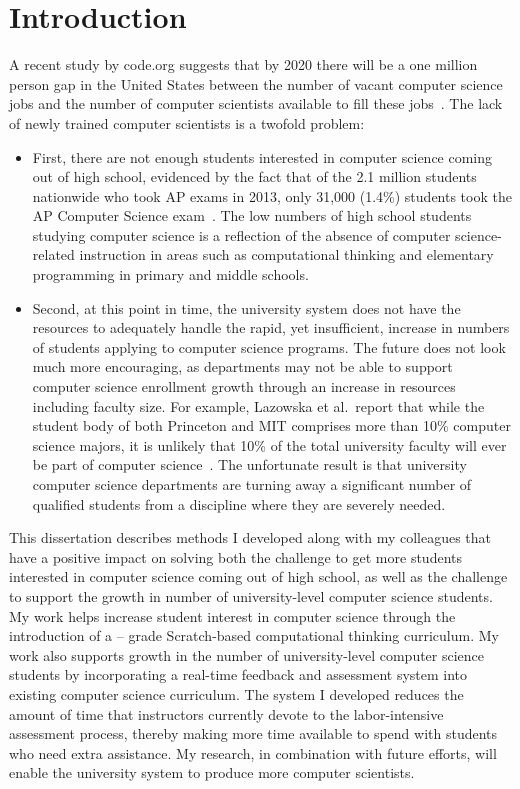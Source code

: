\chapter{Introduction} \label{chap:introduction}
A recent study by code.org suggests that by 2020 there will be a one million
person gap in the United States between the number of vacant computer science
jobs and the number of computer scientists available to fill these
jobs~\cite{codeorg:2013}. The lack of newly trained computer scientists is a
twofold problem:

\begin{itemize}
\item First, there are not enough students interested in computer science
  coming out of high school, evidenced by the fact that of the 2.1 million
  students nationwide who took AP exams in 2013, only 31,000 (1.4\%) students
  took the AP Computer Science exam~\cite{cb:2013}. The low numbers of high
  school students studying computer science is a reflection of the absence of
  computer science-related instruction in areas such as computational thinking
  and elementary programming in primary and middle schools.
\item Second, at this point in time, the university system does not have the
  resources to adequately handle the rapid, yet insufficient, increase in
  numbers of students applying to computer science programs. The future does
  not look much more encouraging, as departments may not be able to support
  computer science enrollment growth through an increase in resources including
  faculty size. For example, Lazowska et al.\ report that while the student
  body of both Princeton and MIT comprises more than 10\% computer science
  majors, it is unlikely that 10\% of the total university faculty will ever be
  part of computer science~\cite{lazowska:2014}. The unfortunate result is that
  university computer science departments are turning away a significant number
  of qualified students from a discipline where they are severely needed.
\end{itemize}

This dissertation describes methods I developed along with my colleagues that
have a positive impact on solving both the challenge to get more students
interested in computer science coming out of high school, as well as the
challenge to support the growth in number of university-level computer science
students. My work helps increase student interest in computer science through
the introduction of a -- grade Scratch-based computational
thinking curriculum. My work also supports growth in the number of
university-level computer science students by incorporating a real-time
feedback and assessment system into existing computer science curriculum. The
system I developed reduces the amount of time that instructors currently devote
to the labor-intensive assessment process, thereby making more time available
to spend with students who need extra assistance. My research, in combination
with future efforts, will enable the university system to produce more computer
scientists.

